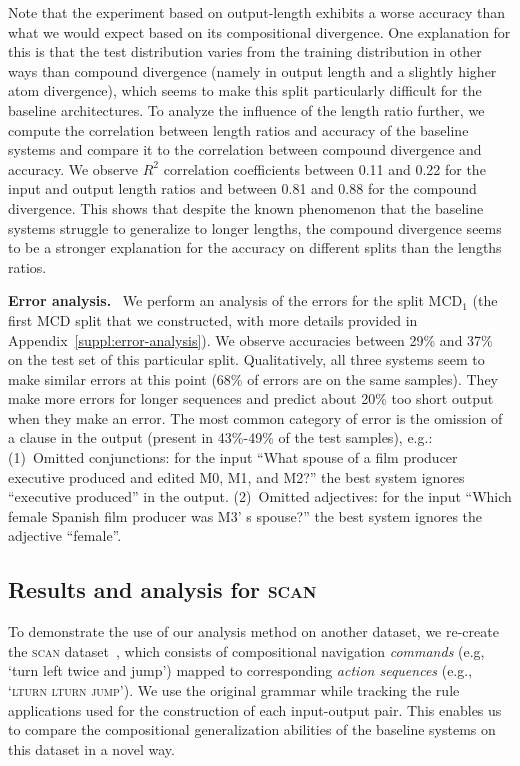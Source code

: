 \documentclass[letterpaper]{article}
\newcommand{\myparagraph}[1]{\textbf{#1}~}
\newcommand{\SCAN}{\textsc{scan}}
\newcommand{\MCD}[1]{MCD$_{#1}$}
\begin{document}
Note that the experiment based on output-length exhibits a worse accuracy than what we would expect based on its compositional divergence. One explanation for this is that the test distribution varies from the training distribution in other ways than compound divergence (namely in output length and a slightly higher atom divergence), which seems to make this split particularly difficult for the baseline architectures.
To analyze the influence of the length ratio further, we compute the correlation between length ratios and accuracy of the baseline systems and compare it to the correlation between compound divergence and accuracy. We observe $R^2$ correlation coefficients between 0.11 and 0.22 for the input and output length ratios and between 0.81 and 0.88 for the compound divergence. This shows that despite the known phenomenon that the baseline systems struggle to generalize to longer lengths, the compound divergence seems to be a stronger explanation for the accuracy on different splits than the lengths ratios.

\myparagraph{Error analysis.}
We perform an analysis of the errors for the split \MCD{1} (the first MCD split that we constructed, with more details provided in Appendix~\ref{suppl:error-analysis}).
We observe accuracies between 29\% and 37\% on the test set of this particular split. 
Qualitatively, all three systems seem to make similar errors at this point (68\% of errors are on the same samples). They make more errors for longer sequences and predict about 20\% too short output when they make an error.
The most common category of error is the omission of a clause in the output (present in 43\%-49\% of the test samples), e.g.: 
(1)~Omitted conjunctions: for the input ``What spouse of a film producer executive produced and edited M0, M1, and M2?'' the best system ignores ``executive produced'' in the output.
(2)~Omitted adjectives: for the input ``Which female Spanish film producer was M3' s spouse?'' the best system ignores the adjective ``female''.

\subsection{Results and analysis for \SCAN{}}
\label{sect:applying-to-scan}

To demonstrate the use of our analysis method on another dataset, we re-create the \SCAN{} dataset~\citep{Lake2018GeneralizationWS},
which consists of compositional navigation \textit{commands} (e.g, `turn left twice and jump')  mapped  to  corresponding  \textit{action  sequences} (e.g., `\textsc{lturn lturn jump}'). We use the original grammar while tracking the rule applications used for the construction of each input-output pair. This enables us to compare the compositional generalization abilities of the baseline systems on this dataset in a novel way. 
\end{document}
